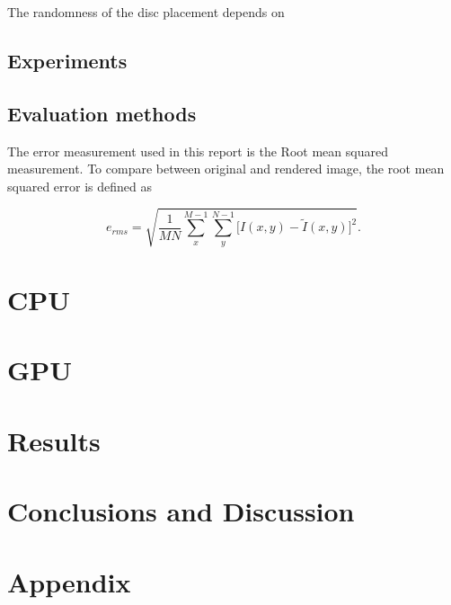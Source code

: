 The randomness of the disc placement depends on 

\subsection{Experiments}


\subsection{Evaluation methods}
The error measurement used in this report is the Root mean squared
measurement. To compare between original and rendered image, the
root mean squared error is defined as

\begin{equation}
e_{rms}=\sqrt{\frac{1}{MN}\sum_x^{M-1}{\sum_y^{N-1}{[I(x,y)-{\widetilde{I}(x,y)]^2}}}}.
\label{eq:rms}
\end{equation}


\section{CPU}

\section{GPU}

\section{Results}


\section{Conclusions and Discussion}



\newpage
\printbibliography
\section{Appendix}

\label{sec:appendix}



